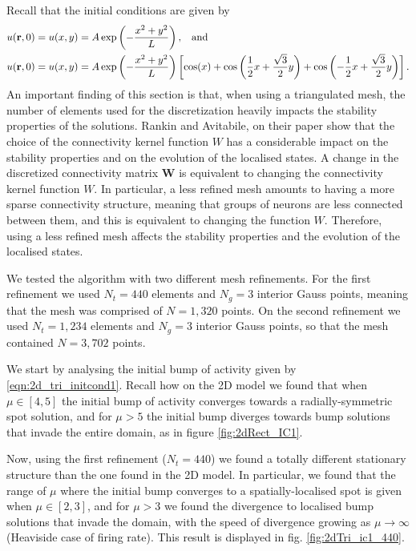 \documentclass{uonmathreport}
\begin{document}
Recall that the initial conditions are given by
\begin{subequations}
	\begin{align}
		u(\mathbf{r},0) = u(x,y) &= A \exp \left(-\frac{x^2+y^2}{L}\right), \hspace{3mm} \textnormal{and} \label{eqn:2d_tri_initcond1}\\
		u(\mathbf{r},0) = u(x,y) &= A \exp \left(-\frac{x^2+y^2}{L}\right) \left[ \cos(x) + \cos\left( \frac{1}{2}x + \frac{\sqrt{3}}{2}y\right) + \cos\left( -\frac{1}{2}x + \frac{\sqrt{3}}{2}y\right)\right].\label{eqn:2d_tri_initcond2}
	\end{align}
\end{subequations}
An important finding of this section is that, when using a triangulated mesh, the number of elements used for the discretization heavily impacts the stability properties of the solutions. Rankin and Avitabile, on their paper \cite{rankin2014continuation} show that the choice of the connectivity kernel function $W$ has a considerable impact on the stability properties and on the evolution of the localised states. A change in the discretized connectivity matrix $\mathbf{W}$ is equivalent to changing the connectivity kernel function $W$. In particular, a less refined mesh amounts to having a more sparse connectivity structure, meaning that groups of neurons are less connected between them, and this is equivalent to changing the function $W$. Therefore, using a less refined mesh affects the stability properties and the evolution of the localised states. 
 
We tested the algorithm with two different mesh refinements. For the first refinement we used $N_t=440$ elements and $N_g=3$ interior Gauss points, meaning that the mesh was comprised of $N=1,320$ points. On the second refinement we used $N_t=1,234$ elements and $N_g=3$ interior Gauss points, so that the mesh contained $N=3,702$ points. 
 
We start by analysing the initial bump of activity given by \ref{eqn:2d_tri_initcond1}. Recall how on the 2D model we found that when $\mu \in [4,5]$ the initial bump of activity converges towards a radially-symmetric spot solution, and for $\mu > 5$ the initial bump diverges towards bump solutions that invade the entire domain, as in figure \ref{fig:2dRect_IC1}. 

Now, using the first refinement ($N_t=440$) we found a totally different stationary structure than the one found in the 2D model. In particular, we found that the range of $\mu$ where the initial bump converges to a spatially-localised spot is given when $\mu \in [2,3]$, and for $\mu > 3$ we found the divergence to localised bump solutions that invade the domain, with the speed of divergence growing as $\mu \rightarrow \infty$ (Heaviside case of firing rate). This result is displayed in fig. \ref{fig:2dTri_ic1_440}.
\end{document}
